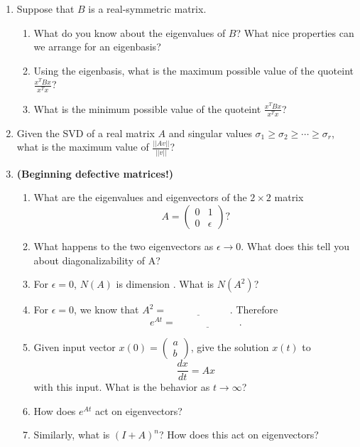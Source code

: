 \documentclass[11pt]{article}
\begin{document}
\begin{enumerate}
\item Suppose that $B$ is a real-symmetric matrix.  
\begin{enumerate}
\item What do you know about the eigenvalues of $B$?  What nice properties can we arrange for an eigenbasis?
\item Using the eigenbasis, what is the maximum possible value of the quoteint $\frac{x^TBx}{x^Tx}$?
\item What is the minimum possible value of the quoteint $\frac{x^TBx}{x^Tx}$?
\end{enumerate}


\item Given the SVD of a real matrix $A$ and singular values $\sigma_1 \geq \sigma_2 \geq \cdots \geq \sigma_r$, what is the maximum value of $\frac{||Av||}{||v||}$?


\item \textbf{(Beginning defective matrices!)} 
\begin{enumerate}
\item What are the eigenvalues and eigenvectors of the $2 \times 2$ matrix
\[A = \begin{pmatrix} 0 & 1 \\ 0 & \epsilon \end{pmatrix}?\]
\item What happens to the two eigenvectors as $\epsilon \to 0$.  What does this tell you about diagonalizability of A?
\item For $\epsilon = 0$, $N(A)$ is dimension \underline{\phantom{aaaaaaaaaaaa}}.  What is $N(A^2)$?
\item For $\epsilon = 0$, we know that $A^2 =  \underline{\phantom{aaaaaaaaaaaa}}$.  Therefore
\[e^{At} = \underline{\phantom{aaaaaaaaaaaa}}. \]
\item Given input vector $x(0) = \begin{pmatrix} a \\ b \end{pmatrix}$, give the solution $x(t)$ to 
\[\frac{dx}{dt} = A x \]
with this input.  What is the behavior as $t\to \infty$?
\item How does $e^{At}$ act on eigenvectors?
\item Similarly, what is $(I+A)^n$?  How does this act on eigenvectors?
\end{enumerate}






\end{enumerate}
\end{document}
